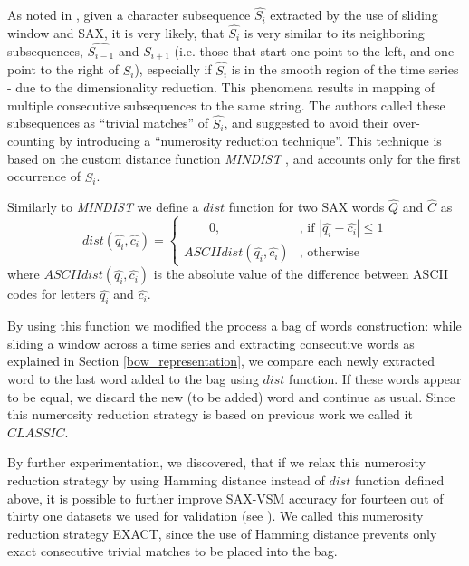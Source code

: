 As noted in \cite{citeulike:2821475}, given a character subsequence $\hat{S_{i}}$ extracted by the use 
of sliding window and SAX, it is very likely, that $\hat{S_{i}}$ is very similar to its
neighboring subsequences, $\hat{S_{i-1}}$ and $\hat{S_{i+1}}$ (i.e. those that start one 
point to the left, and one point to the right of $\hat{S_{i}}$), especially if $\hat{S_{i}}$
is in the smooth region of the time series - due to the dimensionality reduction. 
This phenomena results in mapping of multiple consecutive subsequences
to the same string. The authors called these subsequences as ``trivial matches'' of 
$\hat{S_{i}}$, and suggested to avoid their over-counting by introducing a 
``numerosity reduction technique''. This technique is based on the custom distance 
function \textit{MINDIST} \cite{citeulike:532335}, and accounts only for the first 
occurrence of $\hat{S_{i}}$. 

Similarly to \textit{MINDIST} we define a $dist$ function for two
SAX words $\hat{Q}$ and $\hat{C}$ as
\begin{equation}
dist(\hat{q_{i}},\hat{c_{i}})=
       \begin{cases} \qquad  0, & \mbox{, if } | \hat{q_{i}} - \hat{c_{i}} | \leq 1 \\
        ASCIIdist( \hat{q_{i}} , \hat{c_{i}} ) & \mbox{, otherwise } 
        \end{cases}
\end{equation} 
where $ASCIIdist( \hat{q_{i}}, \hat{c_{i}} )$ is the absolute value of the difference between 
ASCII codes for letters $\hat{q_{i}}$ and $\hat{c_{i}}$.

By using this function we modified the process a bag of words construction: 
while sliding a window across a time series and extracting consecutive words
as explained in Section \ref{bow_representation}, we compare each newly 
extracted word to the last word added to the bag using $dist$ function. 
If these words appear to be equal, we discard the new (to be added) word and 
continue as usual. Since this numerosity reduction strategy is based 
on previous work we called it $CLASSIC$.

By further experimentation, we discovered, that if we relax this numerosity reduction
strategy by using Hamming distance \cite{hamming} instead of $dist$ function
defined above, it is possible to further improve SAX-VSM accuracy for fourteen 
out of thirty one datasets we used for validation (see \cite{citeulike:12563560}). 
We called this numerosity reduction strategy EXACT, since the use of Hamming 
distance prevents only exact consecutive trivial matches to be placed into the bag. 

